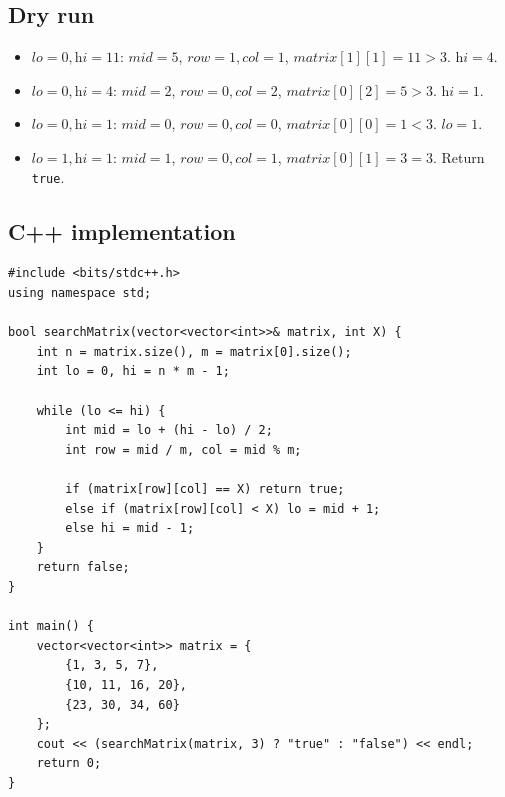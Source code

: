 \subsection*{Dry run}


\begin{itemize}
  \item $\textit{lo}=0,\textit{hi}=11$: $\textit{mid}=5$,
        $\textit{row}=1,\textit{col}=1$,
        $\textit{matrix}[1][1]=11 > 3$. $\textit{hi}=4$.
  \item $\textit{lo}=0,\textit{hi}=4$: $\textit{mid}=2$,
        $\textit{row}=0,\textit{col}=2$,
        $\textit{matrix}[0][2]=5 > 3$. $\textit{hi}=1$.
  \item $\textit{lo}=0,\textit{hi}=1$: $\textit{mid}=0$,
        $\textit{row}=0,\textit{col}=0$,
        $\textit{matrix}[0][0]=1 < 3$. $\textit{lo}=1$.
  \item $\textit{lo}=1,\textit{hi}=1$: $\textit{mid}=1$,
        $\textit{row}=0,\textit{col}=1$,
        $\textit{matrix}[0][1]=3 = 3$. Return \texttt{true}.
\end{itemize}

\subsection*{C++ implementation}

\begin{lstlisting}
#include <bits/stdc++.h>
using namespace std;

bool searchMatrix(vector<vector<int>>& matrix, int X) {
    int n = matrix.size(), m = matrix[0].size();
    int lo = 0, hi = n * m - 1;

    while (lo <= hi) {
        int mid = lo + (hi - lo) / 2;
        int row = mid / m, col = mid % m;

        if (matrix[row][col] == X) return true;
        else if (matrix[row][col] < X) lo = mid + 1;
        else hi = mid - 1;
    }
    return false;
}

int main() {
    vector<vector<int>> matrix = {
        {1, 3, 5, 7},
        {10, 11, 16, 20},
        {23, 30, 34, 60}
    };
    cout << (searchMatrix(matrix, 3) ? "true" : "false") << endl;
    return 0;
}
\end{lstlisting}

